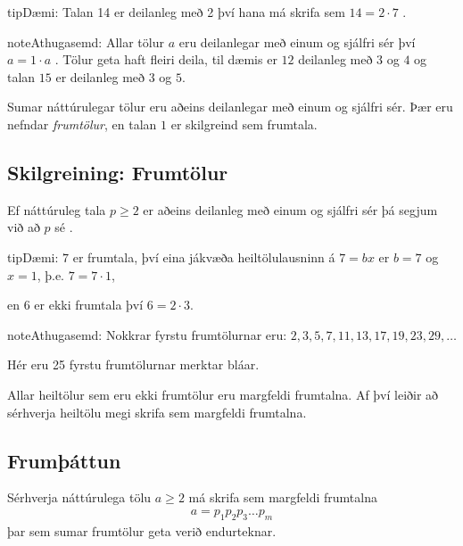 \documentclass[a4paper,10pt,icelandic]{sphinxmanual}
\begin{document}
\begin{sphinxadmonition}{tip}{Dæmi:}
Talan 14 er deilanleg með 2 því hana má skrifa sem \(14=2\cdot 7\) .
\end{sphinxadmonition}

\begin{sphinxadmonition}{note}{Athugasemd:}
Allar tölur \(a\) eru deilanlegar með einum og sjálfri sér því \(a= 1 \cdot a\) . Tölur geta haft fleiri deila, til dæmis er \(12\) deilanleg með \(3\) og \(4\) og talan \(15\) er deilanleg með \(3\) og \(5\).
\end{sphinxadmonition}

Sumar náttúrulegar tölur eru aðeins deilanlegar með einum og sjálfri sér.
Þær eru nefndar \textit{frumtölur}, en talan \(1\) er  skilgreind sem frumtala.


\subsection{Skilgreining: Frumtölur}
\label{\detokenize{Kafli01:skilgreining-frumtolur}}
Ef náttúruleg tala \(p \geq 2\) er aðeins deilanleg með einum og sjálfri sér þá segjum við að \(p\) sé .

\begin{sphinxadmonition}{tip}{Dæmi:}
\(7\) er frumtala, því eina jákvæða heiltölulausninn á \(7=bx\) er \(b=7\) og \(x=1\), þ.e. \(7 = 7 \cdot 1\),

en \(6\) er ekki frumtala því \(6=2 \cdot 3\).
\end{sphinxadmonition}

\begin{sphinxadmonition}{note}{Athugasemd:}
Nokkrar fyrstu frumtölurnar eru: \(2,3,5,7,11,13,17,19,23,29, \dots\)
\end{sphinxadmonition}


Hér eru 25 fyrstu frumtölurnar merktar bláar.

\label{\detokenize{Kafli01:s-frumattun}}
Allar heiltölur sem eru ekki frumtölur eru margfeldi frumtalna. Af því leiðir að sérhverja heiltölu megi skrifa sem margfeldi frumtalna.


\subsection{Frumþáttun}
\label{\detokenize{Kafli01:frumattun}}
Sérhverja náttúrulega tölu \(a \geq 2\) má skrifa sem margfeldi frumtalna
\begin{equation*}
\begin{split}a=p_1 p_2 p_3 \dots p_m\end{split}
\end{equation*}
þar sem sumar frumtölur geta verið endurteknar.
\end{document}
